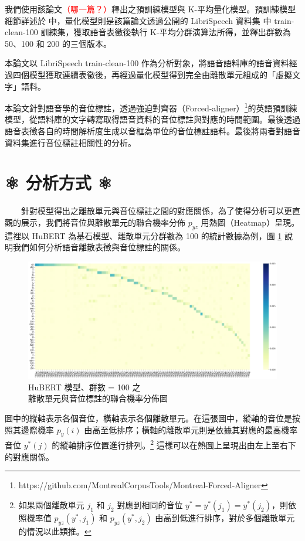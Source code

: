 {        我們使用該論文\textcolor{red}{（哪一篇？）}釋出之預訓練模型與 K-平均量化模型。預訓練模型細節詳述於 \cite{lakhotia_generative_2021-1} 中，量化模型則是該篇論文透過公開的 LibriSpeech 資料集 \cite{panayotov_librispeech_2015} 中 train-clean-100 訓練集，獲取語音表徵後執行 K-平均分群演算法所得，並釋出群數為 50、100 和 200 的三個版本。

        本論文以 LibriSpeech train-clean-100 作為分析對象，將語音語料庫的語音資料經過四個模型獲取連續表徵後，再經過量化模型得到完全由離散單元組成的「虛擬文字」語料。

        本論文針對語音學的音位標註，透過強迫對齊器（Forced-aligner）\footnote{https://github.com/MontrealCorpusTools/Montreal-Forced-Aligner}的英語預訓練模型，從語料庫的文字轉寫取得語音資料的音位標註與對應的時間範圍。最後透過語音表徵各自的時間解析度生成以音框為單位的音位標註語料。最後將兩者對語音資料集進行音位標註相關性的分析。



}%

\section{⚛️ 分析方式 ⚛️}

　　針對模型得出之離散單元與音位標註之間的對應關係，為了使得分析可以更直觀的展示，我們將音位與離散單元的聯合機率分佈 \(p_{yz}\) 用熱圖（Heatmap）呈現。這裡以 HuBERT 為基石模型、離散單元分群數為 100 的統計數據為例，圖 \ref{fig:joint-byprob-hub100} 說明我們如何分析語音離散表徵與音位標註的關係。

\begin{figure}[ht]
    \centering
    \includegraphics[width=1\linewidth]{figures/joint_sortby_prphn-hub-100.png}
    \caption{HuBERT 模型、群數 = 100 之 \\ 離散單元與音位標註的聯合機率分佈圖}
    \label{fig:joint-byprob-hub100}
\end{figure}
        圖中的縱軸表示各個音位，橫軸表示各個離散單元。在這張圖中，縱軸的音位是按照其邊際機率 \(p_y(i)\) 由高至低排序；橫軸的離散單元則是依據其對應的最高機率音位 \(y^\ast(j)\) 的縱軸排序位置進行排列。\footnote{如果兩個離散單元 \(j_1\) 和 \(j_2\) 對應到相同的音位 \(y^\ast = y^\ast(j_1) = y^\ast(j_2)\)，則依照機率值 \(p_{yz}(y^\ast, j_1)\) 和 \(p_{yz}(y^\ast, j_2)\) 由高到低進行排序，對於多個離散單元的情況以此類推。} 這樣可以在熱圖上呈現出由左上至右下的對應關係。
